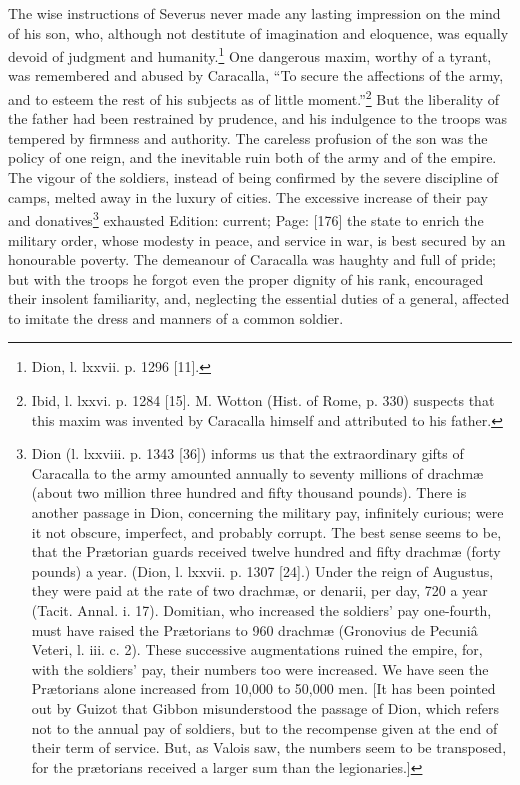 The wise instructions of Severus never made any lasting impression on the mind of his son, who, although not destitute of imagination and eloquence, was equally devoid of judgment and humanity.\footnote{Dion, l. lxxvii. p. 1296 [11].} One dangerous maxim, worthy of a tyrant, was remembered and abused by Caracalla, \texthebrew{“}To secure the affections of the army, and to esteem the rest of his subjects as of little moment.\texthebrew{}”\footnote{Ibid, l. lxxvi. p. 1284 [15]. M. Wotton (Hist. of Rome, p. 330) suspects that this maxim was invented by Caracalla himself and attributed to his father.} But the liberality of the father had been restrained by prudence, and his indulgence to the troops was tempered by firmness and authority. The careless profusion of the son was the policy of one reign, and the inevitable ruin both of the army and of the empire. The vigour of the soldiers, instead of being confirmed by the severe discipline of camps, melted away in the luxury of cities. The excessive increase of their pay and donatives\footnote{Dion (l. lxxviii. p. 1343 [36]) informs us that the extraordinary gifts of Caracalla to the army amounted annually to seventy millions of drachmæ (about two million three hundred and fifty thousand pounds). There is another passage in Dion, concerning the military pay, infinitely curious; were it not obscure, imperfect, and probably corrupt. The best sense seems to be, that the Prætorian guards received twelve hundred and fifty drachmæ (forty pounds) a year. (Dion, l. lxxvii. p. 1307 [24].) Under the reign of Augustus, they were paid at the rate of two drachmæ, or denarii, per day, 720 a year (Tacit. Annal. i. 17). Domitian, who increased the soldiers\texthebrew{}’ pay one-fourth, must have raised the Prætorians to 960 drachmæ (Gronovius de Pecuniâ Veteri, l. iii. c. 2). These successive augmentations ruined the empire, for, with the soldiers\texthebrew{}’ pay, their numbers too were increased. We have seen the Prætorians alone increased from 10,000 to 50,000 men. [It has been pointed out by Guizot that Gibbon misunderstood the passage of Dion, which refers not to the annual pay of soldiers, but to the recompense given at the end of their term of service. But, as Valois saw, the numbers seem to be transposed, for the prætorians received a larger sum than the legionaries.]} exhausted Edition: current; Page: [176] the state to enrich the military order, whose modesty in peace, and service in war, is best secured by an honourable poverty. The demeanour of Caracalla was haughty and full of pride; but with the troops he forgot even the proper dignity of his rank, encouraged their insolent familiarity, and, neglecting the essential duties of a general, affected to imitate the dress and manners of a common soldier.

